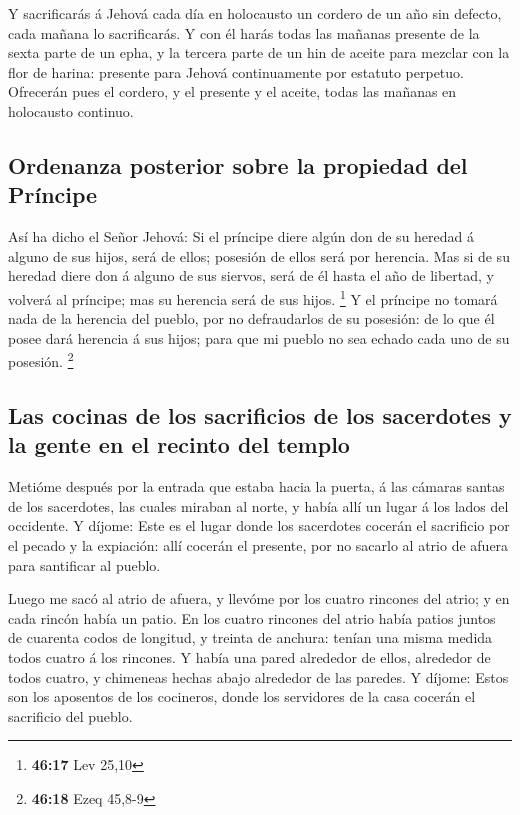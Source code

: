  Y sacrificarás á Jehová cada día en holocausto un
cordero de un año sin defecto, cada mañana lo sacrificarás.
 Y con él harás todas las mañanas presente de la sexta
parte de un epha, y la tercera parte de un hin de aceite para mezclar
con la flor de harina: presente para Jehová continuamente por estatuto
perpetuo.  Ofrecerán pues el cordero, y el presente y el
aceite, todas las mañanas en holocausto continuo.

\hypertarget{ordenanza-posterior-sobre-la-propiedad-del-pruxedncipe}{%
\subsection{Ordenanza posterior sobre la propiedad del
Príncipe}\label{ordenanza-posterior-sobre-la-propiedad-del-pruxedncipe}}

 Así ha dicho el Señor Jehová: Si el príncipe diere algún
don de su heredad á alguno de sus hijos, será de ellos; posesión de
ellos será por herencia.  Mas si de su heredad diere don
á alguno de sus siervos, será de él hasta el año de libertad, y volverá
al príncipe; mas su herencia será de sus hijos. \footnote{\textbf{46:17}
  Lev 25,10}  Y el príncipe no tomará nada de la herencia
del pueblo, por no defraudarlos de su posesión: de lo que él posee dará
herencia á sus hijos; para que mi pueblo no sea echado cada uno de su
posesión. \footnote{\textbf{46:18} Ezeq 45,8-9}

\hypertarget{las-cocinas-de-los-sacrificios-de-los-sacerdotes-y-la-gente-en-el-recinto-del-templo}{%
\subsection{Las cocinas de los sacrificios de los sacerdotes y la gente
en el recinto del
templo}\label{las-cocinas-de-los-sacrificios-de-los-sacerdotes-y-la-gente-en-el-recinto-del-templo}}

 Metióme después por la entrada que estaba hacia la
puerta, á las cámaras santas de los sacerdotes, las cuales miraban al
norte, y había allí un lugar á los lados del occidente. 
Y díjome: Este es el lugar donde los sacerdotes cocerán el sacrificio
por el pecado y la expiación: allí cocerán el presente, por no sacarlo
al atrio de afuera para santificar al pueblo.

 Luego me sacó al atrio de afuera, y llevóme por los
cuatro rincones del atrio; y en cada rincón había un patio.
 En los cuatro rincones del atrio había patios juntos de
cuarenta codos de longitud, y treinta de anchura: tenían una misma
medida todos cuatro á los rincones.  Y había una pared
alrededor de ellos, alrededor de todos cuatro, y chimeneas hechas abajo
alrededor de las paredes.  Y díjome: Estos son los
aposentos de los cocineros, donde los servidores de la casa cocerán el
sacrificio del pueblo.

